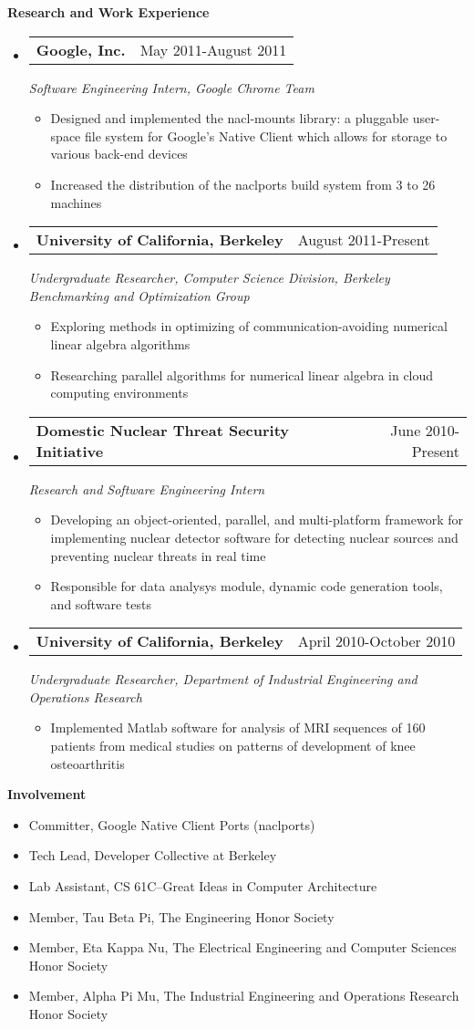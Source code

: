 \documentclass[letterpaper,11pt]{article}
\makeatletter
\newcommand{\resitem}[1]{\item #1 \vspace{-2pt}}
\newcommand{\desitem}[1]{\item #1 \vspace{-7pt}}
\newcommand{\resheading}[1]{{\large \colorbox{mygrey}{\begin{minipage}{\textwidth}{\textbf{#1 \vphantom{p\^{E}}}}\end{minipage}}}}
\newcommand{\expsubheading}[3]{
\begin{tabular*}{7.0in}{l@{\extracolsep{\fill}}r}
		\textbf{#1} & #2 \\
\end{tabular*}
\emph{#3}
\vspace{-6pt}
}
\makeatother
\begin{document}
\resheading{Research and Work Experience}
\begin{itemize}
\item
     \expsubheading{Google, Inc.}{May 2011-August 2011}{Software Engineering Intern, Google Chrome Team}
     \begin{itemize}
         \resitem{Designed and implemented the nacl-mounts library: a pluggable user-space file system for Google's Native Client which allows for storage to various back-end devices}
         \resitem{Increased the distribution of the naclports build system from 3 to 26 machines}
     \end{itemize}
     
\item
   \expsubheading{University of California, Berkeley}{August 2011-Present}{Undergraduate Researcher, Computer Science Division, Berkeley Benchmarking and Optimization Group}
    \begin{itemize}
         \resitem{Exploring methods in optimizing of communication-avoiding numerical linear algebra algorithms}
         \resitem{Researching parallel algorithms for numerical linear algebra in cloud computing environments}
     \end{itemize}
     
\item
    \expsubheading{Domestic Nuclear Threat Security Initiative}{June 2010-Present}{Research and Software Engineering Intern}
    \begin{itemize}
         \resitem{Developing an object-oriented, parallel, and multi-platform framework for implementing nuclear detector software for detecting nuclear sources and preventing nuclear threats in real time}
         \resitem{Responsible for data analysys module, dynamic code generation tools, and software tests}
     \end{itemize}    
     
\item
   \expsubheading{University of California, Berkeley}{April 2010-October 2010}{Undergraduate Researcher, Department of Industrial Engineering and Operations Research}
    \begin{itemize}
         \resitem{Implemented Matlab software for analysis of MRI sequences of 160 patients from medical studies on patterns of development of knee osteoarthritis}
     \end{itemize}
\end{itemize}

\resheading{Involvement}
\begin{itemize}
    \desitem{Committer,
    Google Native Client Ports (naclports)}
    \desitem{Tech Lead,
    Developer Collective at Berkeley}
    \desitem{Lab Assistant,
    CS 61C--Great Ideas in Computer Architecture}
    \desitem{Member,
    Tau Beta Pi, The Engineering Honor Society}
     \desitem{Member,
    Eta Kappa Nu, The Electrical Engineering and Computer Sciences Honor Society}
    \desitem{Member,
    Alpha Pi Mu, The Industrial Engineering and Operations Research Honor Society}
\end{itemize}
\end{document}
